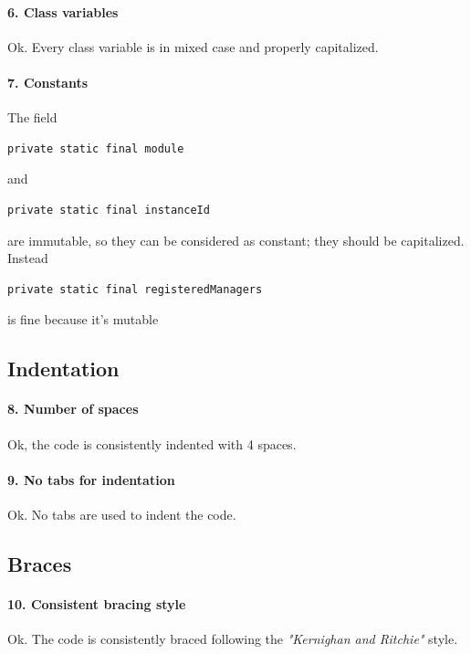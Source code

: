 \documentclass[english]{article}
\begin{document}
\paragraph{6. Class variables}
Ok. Every class variable is in mixed case and properly capitalized.

\paragraph{7. Constants}
The field 
\begin{lstlisting} 
private static final module 
\end{lstlisting} 
and 
\begin{lstlisting} 
private static final instanceId 
\end{lstlisting} 
are immutable, so they can be considered as constant; they should be capitalized. \\
Instead 
\begin{lstlisting} 
private static final registeredManagers 
\end{lstlisting}
 is fine because it's mutable


\subsection{Indentation}

\paragraph{8. Number of spaces}
Ok, the code is consistently indented with 4 spaces.

\paragraph{9. No tabs for indentation}
Ok. No tabs are used to indent the code.

\subsection{Braces}

\paragraph{10. Consistent bracing style}
Ok.
The code is consistently braced following the \textit{"Kernighan and Ritchie"} style.
\end{document}
